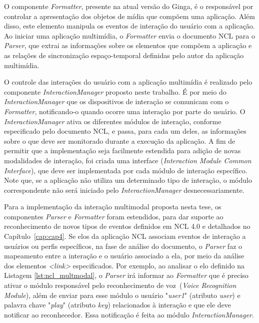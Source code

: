 O componente \textit{Formatter}, presente na atual versão do Ginga, é o responsável por controlar a apresentação dos objetos de mídia que compõem uma aplicação. Além disso, este elemento manipula os eventos de interação do usuário com a aplicação. Ao iniciar uma aplicação multimídia, o \textit{Formatter} envia o documento NCL para o \textit{Parser}, que extrai as informações sobre os elementos que compõem a aplicação e as relações de sincronização espaço-temporal definidas pelo autor da aplicação multimídia. 

O controle das interações do usuário com a aplicação multimídia é realizado pelo componente \textit{InteractionManager} proposto neste trabalho. É por meio do \textit{InteractionManager} que os dispositivos de interação se comunicam com o \textit{Formatter}, notificando-o quando ocorre uma interação por parte do usuário. O \textit{InteractionManager} ativa os diferentes módulos de interação, conforme especificado pelo documento NCL, e passa, para cada um deles, as informações sobre o que deve ser monitorado durante a execução da aplicação. A fim de permitir que a implementação seja facilmente estendida para adição de novas modalidades de interação, foi criada uma interface (\textit{Interaction Module Common Interface}), que deve ser implementada por cada módulo de interação específico. Note que, se a aplicação não utiliza um determinado tipo de interação, o módulo correspondente não será iniciado pelo \textit{InteractionManager} desnecessariamente.

Para a implementação da interação multimodal proposta nesta tese, os componentes \textit{Parser} e \textit{Formatter} foram estendidos, para dar suporte ao reconhecimento de novos tipos de eventos definidos em NCL 4.0 e  detalhados no Capítulo~\ref{cap:cap4}. Se elos da aplicação NCL associam eventos de interação a usuários ou perfis específicos, na fase de análise do documento, o \textit{Parser} faz o mapeamento entre a interação e o usuário associado a ela, por meio da análise dos elementos \textit{<link>} especificados. Por exemplo, ao analisar o elo definido na Listagem \ref{lst:ncl_multmodal}, o \textit{Parser} irá informar ao \textit{Formatter} que é preciso ativar o módulo responsável pelo reconhecimento de voz~(\textit{Voice Recognition Module}), além de enviar para esse módulo o usuário "\textit{user1}" (atributo \textit{user}) e palavra chave  "\textit{play}" (atributo \textit{key}) relacionados à interação e que ele deve notificar ao reconhecedor. Essa notificação é feita ao módulo \textit{InteractionManager}.

